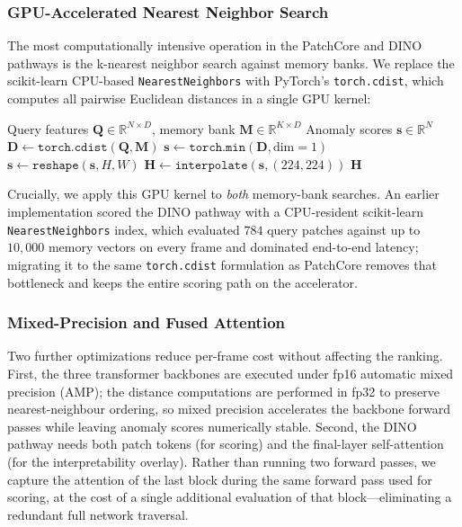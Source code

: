\documentclass[journal]{IEEEtran}
\begin{document}
\subsubsection{GPU-Accelerated Nearest Neighbor Search}

The most computationally intensive operation in the PatchCore and DINO pathways is the k-nearest neighbor search against memory banks. We replace the scikit-learn CPU-based \texttt{NearestNeighbors} with PyTorch's \texttt{torch.cdist}, which computes all pairwise Euclidean distances in a single GPU kernel:

\begin{algorithm}[t]
\caption{GPU-Accelerated Batch Anomaly Scoring}
\label{alg:gpu_scoring}
\begin{algorithmic}[1]
\REQUIRE Query features $\mathbf{Q} \in \mathbb{R}^{N \times D}$, memory bank $\mathbf{M} \in \mathbb{R}^{K \times D}$
\ENSURE Anomaly scores $\mathbf{s} \in \mathbb{R}^{N}$
\STATE $\mathbf{D} \gets \texttt{torch.cdist}(\mathbf{Q}, \mathbf{M})$ 
\STATE $\mathbf{s} \gets \texttt{torch.min}(\mathbf{D}, \text{dim}=1)$ 
\STATE $\mathbf{s} \gets \texttt{reshape}(\mathbf{s}, H, W)$ 
\STATE $\mathbf{H} \gets \texttt{interpolate}(\mathbf{s}, (224, 224))$ 
\RETURN $\mathbf{H}$
\end{algorithmic}
\end{algorithm}

Crucially, we apply this GPU kernel to \emph{both} memory-bank searches. An earlier implementation scored the DINO pathway with a CPU-resident scikit-learn \texttt{NearestNeighbors} index, which evaluated $784$ query patches against up to $10{,}000$ memory vectors on every frame and dominated end-to-end latency; migrating it to the same \texttt{torch.cdist} formulation as PatchCore removes that bottleneck and keeps the entire scoring path on the accelerator.

\subsubsection{Mixed-Precision and Fused Attention}

Two further optimizations reduce per-frame cost without affecting the ranking. First, the three transformer backbones are executed under fp16 automatic mixed precision (AMP); the distance computations are performed in fp32 to preserve nearest-neighbour ordering, so mixed precision accelerates the backbone forward passes while leaving anomaly scores numerically stable. Second, the DINO pathway needs both patch tokens (for scoring) and the final-layer self-attention (for the interpretability overlay). Rather than running two forward passes, we capture the attention of the last block during the same forward pass used for scoring, at the cost of a single additional evaluation of that block---eliminating a redundant full network traversal.
\end{document}
